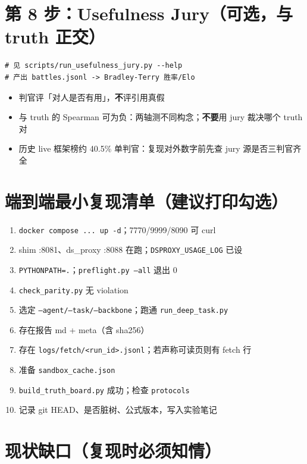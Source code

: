 \documentclass[10.5pt,a4paper]{article}
\begin{document}
\section{第 8 步：Usefulness Jury（可选，与 truth 正交）}

\begin{lstlisting}
# 见 scripts/run_usefulness_jury.py --help
# 产出 battles.jsonl -> Bradley-Terry 胜率/Elo
\end{lstlisting}

\begin{itemize}
  \item 判官评「对人是否有用」，\textbf{不}评引用真假
  \item 与 truth 的 Spearman 可为负：两轴测不同构念；\textbf{不要}用 jury 裁决哪个 truth 对
  \item 历史 live 框架榜约 40.5\% 单判官：复现对外数字前先查 jury 源是否三判官齐全
\end{itemize}

\section{端到端最小复现清单（建议打印勾选）}

\begin{enumerate}
  \item[ ] \texttt{docker compose ... up -d}；7770/9999/8090 可 curl
  \item[ ] shim :8081、ds\_proxy :8088 在跑；\texttt{DSPROXY\_USAGE\_LOG} 已设
  \item[ ] \texttt{PYTHONPATH=.}；\texttt{preflight.py --all} 退出 0
  \item[ ] \texttt{check\_parity.py} 无 violation
  \item[ ] 选定 \texttt{--agent/--task/--backbone}；跑通 \texttt{run\_deep\_task.py}
  \item[ ] 存在报告 md + meta（含 sha256）
  \item[ ] 存在 \texttt{logs/fetch/<run\_id>.jsonl}；若声称可读页则有 fetch 行
  \item[ ] 准备 \texttt{sandbox\_cache.json}
  \item[ ] \texttt{build\_truth\_board.py} 成功；检查 \texttt{protocols}
  \item[ ] 记录 git HEAD、是否脏树、公式版本，写入实验笔记
\end{enumerate}

\section{现状缺口（复现时必须知情）}\label{sec:gap}
\end{document}
